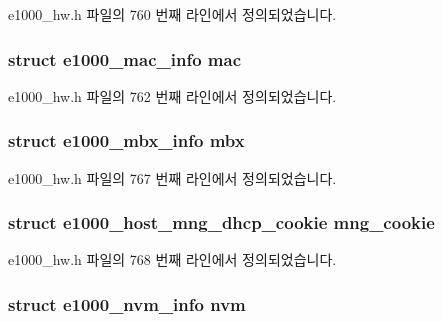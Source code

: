 e1000\+\_\+hw.\+h 파일의 760 번째 라인에서 정의되었습니다.

\subsubsection[{\texorpdfstring{mac}{mac}}]{\setlength{\rightskip}{0pt plus 5cm}struct {\bf e1000\+\_\+mac\+\_\+info} mac}\hypertarget{structe1000__hw_aab7fce7aa13ba97459b3b65acf02f520}{}\label{structe1000__hw_aab7fce7aa13ba97459b3b65acf02f520}


e1000\+\_\+hw.\+h 파일의 762 번째 라인에서 정의되었습니다.

\subsubsection[{\texorpdfstring{mbx}{mbx}}]{\setlength{\rightskip}{0pt plus 5cm}struct {\bf e1000\+\_\+mbx\+\_\+info} mbx}\hypertarget{structe1000__hw_ad9c9b2a6686763d81d8b45c8abf3e1a4}{}\label{structe1000__hw_ad9c9b2a6686763d81d8b45c8abf3e1a4}


e1000\+\_\+hw.\+h 파일의 767 번째 라인에서 정의되었습니다.

\subsubsection[{\texorpdfstring{mng\+\_\+cookie}{mng_cookie}}]{\setlength{\rightskip}{0pt plus 5cm}struct {\bf e1000\+\_\+host\+\_\+mng\+\_\+dhcp\+\_\+cookie} mng\+\_\+cookie}\hypertarget{structe1000__hw_a81aab50e7ccea033c6c4306545157b32}{}\label{structe1000__hw_a81aab50e7ccea033c6c4306545157b32}


e1000\+\_\+hw.\+h 파일의 768 번째 라인에서 정의되었습니다.

\subsubsection[{\texorpdfstring{nvm}{nvm}}]{\setlength{\rightskip}{0pt plus 5cm}struct {\bf e1000\+\_\+nvm\+\_\+info} nvm}\hypertarget{structe1000__hw_ac6844c747771b07e1682238abdb95fdd}{}\label{structe1000__hw_ac6844c747771b07e1682238abdb95fdd}


